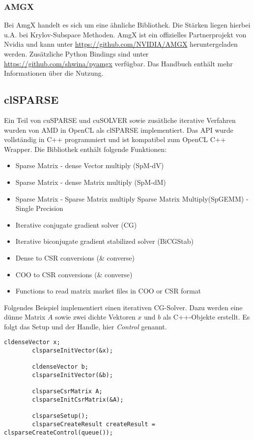 			\subsubsection{AMGX}	
			Bei AmgX handelt es sich um eine ähnliche Bibliothek. Die Stärken liegen hierbei u.A. bei Krylov-Subspace Methoden. AmgX ist ein offizielles Partnerprojekt von Nvidia und kann unter \url{https://github.com/NVIDIA/AMGX} heruntergeladen werden. Zusätzliche Python Bindings sind unter \url{https://github.com/shwina/pyamgx} verfügbar. Das Handbuch enthält mehr Informationen über die Nutzung. \autocite{amgx}	
			
		\subsection{clSPARSE}
		Ein Teil von cuSPARSE und cuSOLVER sowie zusätliche iterative Verfahren wurden von AMD in OpenCL als clSPARSE implementiert. Das \Gls{API} wurde vollständig in C++ programmiert und ist kompatibel zum OpenCL C++ Wrapper. Die Bibliothek enthält folgende Funktionen:
		
		\begin{itemize}				
			\item Sparse Matrix - dense Vector multiply (SpM-dV)
			\item Sparse Matrix - dense Matrix multiply (SpM-dM)
			\item Sparse Matrix - Sparse Matrix multiply Sparse Matrix Multiply(SpGEMM) - Single Precision
			\item Iterative conjugate gradient solver (CG)
			\item Iterative biconjugate gradient stabilized solver (BiCGStab)
			\item Dense to CSR conversions (\& converse)
			\item COO to CSR conversions (\& converse)
			\item Functions to read matrix market files in COO or CSR format
    	\end{itemize}
    	
    	Folgendes Beispiel implementiert einen iterativen CG-Solver. Dazu werden eine dünne Matrix $A$ sowie zwei dichte Vektoren $x$ und $b$ als C++-Objekte erstellt. Es folgt das Setup und der \Gls{Handle}, hier \textit{Control} genannt. 
    	\begin{lstlisting}[caption=clSPARSE: Initialisieren]
		cldenseVector x;
		clsparseInitVector(&x);
		
		cldenseVector b;
		clsparseInitVector(&b); 

		clsparseCsrMatrix A;
		clsparseInitCsrMatrix(&A); 
    	
		clsparseSetup();
		clsparseCreateResult createResult = clsparseCreateControl(queue());
    	\end{lstlisting}

